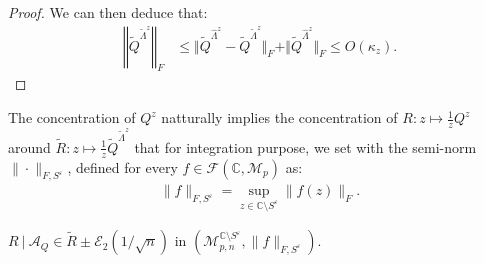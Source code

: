 \documentclass[a4papaer, titlepage]{book}
\begin{document}
\begin{proof}
  We can then deduce that:
  \begin{align*}
    \left\Vert \tilde Q^{\tilde \Lambda^z}\right\Vert_F
    &\leq \Vert \tilde Q^{\hat \Lambda^z} - \tilde Q^{\tilde \Lambda^z} \Vert_F + \Vert \tilde Q^{\hat \Lambda^z} \Vert_F \leq O(\kappa_z).
  \end{align*}

\end{proof}


The concentration of $Q^z$ natturally implies the concentration of $R: z \mapsto \frac{1}{z}Q^z$ around $\tilde R: z \mapsto \frac{1}{z}\tilde Q^{\tilde \Lambda^z}$ that for integration purpose, we set with  the semi-norm $\| \cdot \|_{F,S^\varepsilon}$, defined for every $f \in \mathcal F(\mathbb C,\mathcal M_{p})$ as:
  \begin{align*}
    \| f \|_{F,S^\varepsilon} = \sup_{z \in \mathbb C \setminus S^\varepsilon} \|f(z)\|_F.
  \end{align*}


\begin{theorem}\label{the:concentration_resolvente_main_res}
  $R \ | \ \mathcal A_Q \in \tilde R \pm \mathcal E_2(1/\sqrt n)$ in $(\mathcal{M}_{p,n}^{\mathbb C \setminus S^{\varepsilon}}, \| f \|_{F,S^\varepsilon})$.
\end{theorem}
\end{document}

